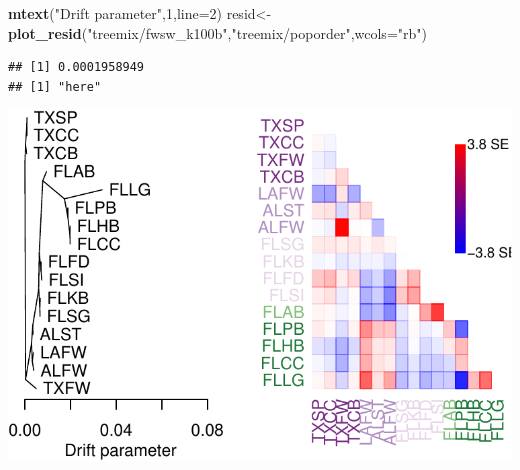 \documentclass[]{article}
\newenvironment{Shaded}{\begin{snugshade}}{\end{snugshade}}
\newcommand{\KeywordTok}[1]{\textcolor[rgb]{0.13,0.29,0.53}{\textbf{#1}}}
\newcommand{\DataTypeTok}[1]{\textcolor[rgb]{0.13,0.29,0.53}{#1}}
\newcommand{\DecValTok}[1]{\textcolor[rgb]{0.00,0.00,0.81}{#1}}
\newcommand{\StringTok}[1]{\textcolor[rgb]{0.31,0.60,0.02}{#1}}
\newcommand{\NormalTok}[1]{#1}
\begin{document}
\begin{Shaded}
\begin{Highlighting}[]
\KeywordTok{mtext}\NormalTok{(}\StringTok{"Drift parameter"}\NormalTok{,}\DecValTok{1}\NormalTok{,}\DataTypeTok{line=}\DecValTok{2}\NormalTok{)}
\NormalTok{resid<-}\KeywordTok{plot_resid}\NormalTok{(}\StringTok{"treemix/fwsw_k100b"}\NormalTok{,}\StringTok{"treemix/poporder"}\NormalTok{,}\DataTypeTok{wcols=}\StringTok{"rb"}\NormalTok{)}
\end{Highlighting}
\end{Shaded}

\begin{verbatim}
## [1] 0.0001958949
## [1] "here"
\end{verbatim}

\includegraphics{202_fwsw_reanalysis_files/figure-latex/treemixPrep-1}
\end{document}
